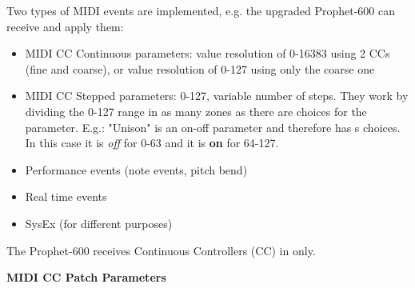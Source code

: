 Two types of MIDI events are implemented, e.g. the upgraded Prophet-600 can receive and apply them:

\begin{itemize}
  \setlength\itemsep{0cm}
  \item MIDI CC Continuous parameters: value resolution of 0-16383 using 2 CCs (fine and coarse), or value resolution of 0-127 using only the coarse one
  \item MIDI CC Stepped parameters: 0-127, variable number of steps. They work by dividing the 0-127 range in as many zones as there are choices for the parameter. E.g.: "Unison" is an on-off parameter and therefore has s choices. In this case it is \textit{off} for 0-63 and it is \textbf{on} for 64-127.
  \item Performance events (note events, pitch bend)
  \item Real time events
  \item SysEx (for different purposes)
\end{itemize}

The Prophet-600 receives Continuous Controllers (CC) in \presetmode only. 

\textbf{MIDI CC Patch Parameters} 

\footnotesize
\renewcommand{\arraystretch}{1.3}

